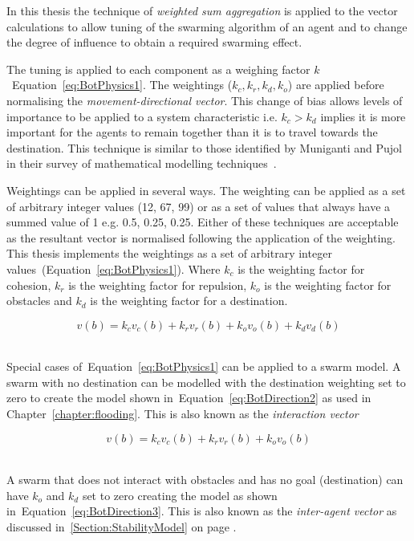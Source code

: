 In this thesis the technique of \textit{weighted sum aggregation} is applied to the vector calculations to allow tuning of the swarming algorithm of an agent and to change the degree of influence to obtain a required swarming effect. 

The tuning is applied to each component as a weighing factor $k$~Equation~\ref{eq:BotPhysics1}. The weightings ($k_c, k_r, k_d, k_o$) are applied before normalising the \textit{movement-directional vector}. This change of bias allows levels of importance to be applied to a system characteristic i.e. $k_c > k_d$ implies it is more important for the agents to remain together than it is to travel towards the destination. This technique is similar to those identified by Muniganti and Pujol in their survey of mathematical modelling techniques~\cite{MP:10}. 

Weightings can be applied in several ways. The weighting can be applied as a set of arbitrary integer values (12, 67, 99) or as a set of values that always have a summed value of 1 e.g. 0.5, 0.25, 0.25. Either of these techniques are acceptable as the resultant vector is normalised following the application of the weighting. This thesis implements the weightings as a set of arbitrary integer values~(Equation~\ref{eq:BotPhysics1}). Where $k_c$ is the weighting factor for cohesion, $k_r$ is the weighting factor for repulsion, $k_o$ is the weighting factor for obstacles and $k_d$ is the weighting factor for a destination. 

\begin{equation}\label{eq:BotPhysics1}‎
v(b) =‎ k_cv_c(b) + k_rv_r(b) + k_ov_o(b) + k_dv_d(b)
\end{equation}‎

Special cases of~Equation~\ref{eq:BotPhysics1} can be applied to a swarm model. A swarm with no destination can be modelled with the destination weighting set to zero to create the model shown in~Equation~\ref{eq:BotDirection2} as used in Chapter~\ref{chapter:flooding}. This is also known as the \textit{interaction vector}

\begin{center}
\begin{equation}
\label{eq:BotDirection2}
v(b) =‎ k_cv_c(b) + k_rv_r(b) + k_ov_o(b)
\end{equation}‎
\end{center}

A swarm that does not interact with obstacles and has no goal (destination) can have $k_o$ and $k_d$ set to zero creating the model as shown in~Equation~\ref{eq:BotDirection3}. This is also known as the \textit{inter-agent vector} as discussed in~\autoref{Section:StabilityModel} on page \pageref{Section:StabilityModel}.

